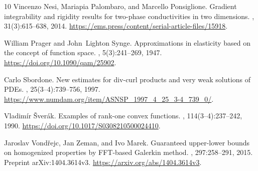 \documentclass[11pt,a4paper]{article}
\numberwithin{equation}{section}
\theoremstyle{definition}
\theoremstyle{remark}\newtheorem{remark}[theorem]{Remark}
\begin{document}
\begin{thebibliography}{10}
Vincenzo Nesi, Mariapia Palombaro, and Marcello Ponsiglione.
\newblock Gradient integrability and rigidity results for two-phase
  conductivities in two dimensions.
, 31(3):615--638, 2014.
\newblock \url{https://ems.press/content/serial-article-files/15918}.

William Prager and John~Lighton Synge.
\newblock Approximations in elasticity based on the concept of function space.
, 5(3):241--269, 1947.
\newblock \url{https://doi.org/10.1090/qam/25902}.

Carlo Sbordone.
\newblock New estimates for div-curl products and very weak solutions of
  {PDEs}.
, 25(3--4):739--756, 1997.
\newblock \url{https://www.numdam.org/item/ASNSP_1997_4_25_3-4_739_0/}.

Vladim{\'i}r {\v S}ver{\'a}k.
\newblock Examples of rank-one convex functions.
, 114(3--4):237--242, 1990.
\newblock \url{https://doi.org/10.1017/S0308210500024410}.

Jaroslav Vond{\v r}ejc, Jan Zeman, and Ivo Marek.
\newblock Guaranteed upper-lower bounds on homogenized properties by
  {FFT}-based {Galerkin} method.
,
  297:258--291, 2015.
\newblock Preprint arXiv:1404.3614v3. \url{https://arxiv.org/abs/1404.3614v3}.

\end{thebibliography}
\end{document}
